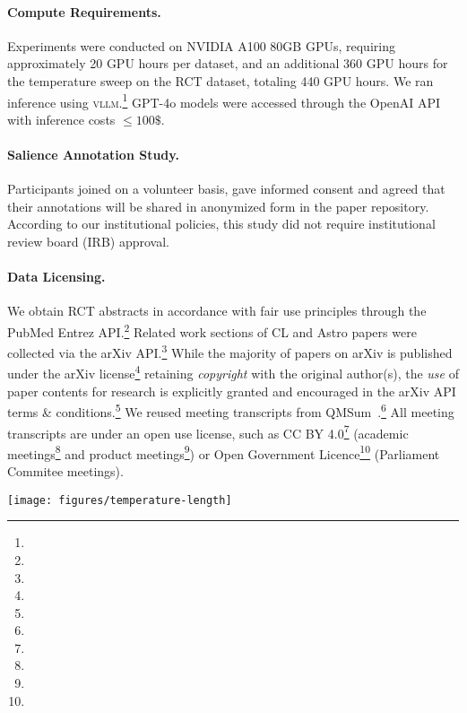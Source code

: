 \paragraph{Compute Requirements.} Experiments were conducted on NVIDIA A100 80GB GPUs, requiring approximately 20 GPU hours per dataset, and an additional 360 GPU hours for the temperature sweep on the RCT dataset, totaling 440 GPU hours.
We ran inference using \textsc{vllm}.\footnote{}
GPT-4o models were accessed through the OpenAI API with inference costs $\leq 100\$$.

\paragraph{Salience Annotation Study.} Participants joined on a volunteer basis, gave informed consent and agreed that their annotations will be shared in anonymized form in the paper repository. According to our institutional policies, this study did not require institutional review board (IRB) approval.

\paragraph{Data Licensing.}
We obtain RCT abstracts in accordance with fair use principles through the PubMed Entrez API.\footnote{}
Related work sections of CL and Astro papers were collected via the arXiv API.\footnote{} While the majority of papers on arXiv is published under the arXiv license\footnote{} retaining \emph{copyright} with the original author(s), the \emph{use} of paper contents for research is explicitly granted and encouraged in the arXiv API terms \& conditions.\footnote{}
We reused meeting transcripts from QMSum~\cite{Zhong:2021:NAACL}.\footnote{} All meeting transcripts are under an open use license, such as CC BY 4.0\footnote{} (academic meetings\footnote{} and product meetings\footnote{}) or Open Government Licence\footnote{} (Parliament Commitee meetings).


\begin{figure*}[t]
\texttt{[image: figures/temperature-length]}
\caption{Influence of temperature on generated summary length. \textbf{Left:} target length-ratio. \textbf{Center:} ``within-document length variance'' calculated as the mean deviation from the average summary length of 5 summaries for the same document (MAD). MAD is normalized to be comparable across length targets. \textbf{Right:} zoomed version.}
\label{fig:temperature-length}
\end{figure*}

